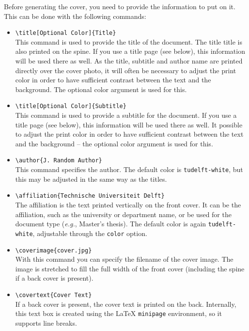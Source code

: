 Before generating the cover, you need to provide the information to put on it. This can be done with the following commands:
\begin{itemize}
\item\texttt{\textbackslash title[Optional Color]\{Title\}} \\
    This command is used to provide the title of the document. The title
    title is also printed on the spine. If you use a title page (see below), this information will be used there as well.
    As the title, subtitle and author name are printed directly over the cover photo, it will often be necessary to adjust the print color in order to have
    sufficient contrast between the text and the background. The optional color argument is used for this.
\item\texttt{\textbackslash title[Optional Color]\{Subtitle\}} \\
    This command is used to provide a subtitle for the document. If you use a title page (see below), this information will be used there as well.
    It possible to adjust the print color in order to have
    sufficient contrast between the text and the background -- the optional color argument is used for this.
\item\texttt{\textbackslash author\{J.\ Random Author\}} \\
    This command specifies the author. The default color is \texttt{tudelft-white}, but this may be adjusted in the same way as the titles.
\item\texttt{\textbackslash affiliation\{Technische Universiteit Delft\}} \\
    The affiliation is the text printed vertically on the front cover. It can be the affiliation, such as the university or department name, or be used for the document type (\emph{e.g.}, Master's thesis). The default color is again \texttt{tudelft-white}, adjustable through the \texttt{color} option.
\item\texttt{\textbackslash coverimage\{cover.jpg\}} \\
    With this command you can specify the filename of the cover image. The image is stretched to fill the full width of the front cover (including the spine if a back cover is present).
\item\texttt{\textbackslash covertext\{Cover Text\}} \\
    If a back cover is present, the cover text is printed on the back. Internally, this text box is created using the \LaTeX{} \texttt{minipage} environment, so it supports line breaks.

\end{itemize}
